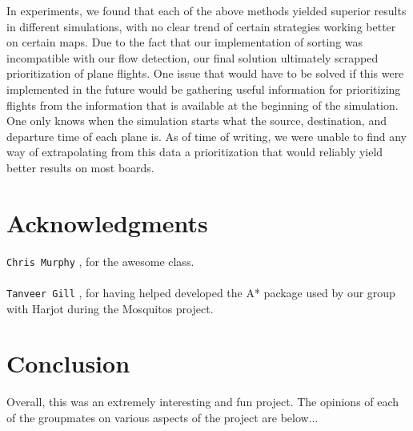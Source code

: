 \documentclass[10pt]{article}
\newcommand{\ms}[1] {
  \texttt{#1}
}
\begin{document}
In experiments, we found that each of the above methods yielded superior results in different
simulations, with no clear trend of certain strategies working better on certain maps. Due to the
fact that our implementation of sorting was incompatible with our flow detection, our final solution
ultimately scrapped prioritization of plane flights. One issue that would have to be solved if this
were implemented in the future would be gathering useful information for prioritizing flights from
the information that is available at the beginning of the simulation. One only knows when the simulation
starts what the source, destination, and departure time of each plane is. As of time of writing, we 
were unable to find any way of extrapolating from this data a prioritization that would reliably yield
better results on most boards.

\newpage
\section{Acknowledgments}

\ms{Chris Murphy}, for the awesome class.\\\\
\ms{Tanveer Gill}, for having helped developed the A* package used by our group with Harjot during
the Mosquitos project.

\newpage
\section{Conclusion}

Overall, this was an extremely interesting and fun project. The opinions of each of the groupmates on
various aspects of the project are below...
\end{document}
